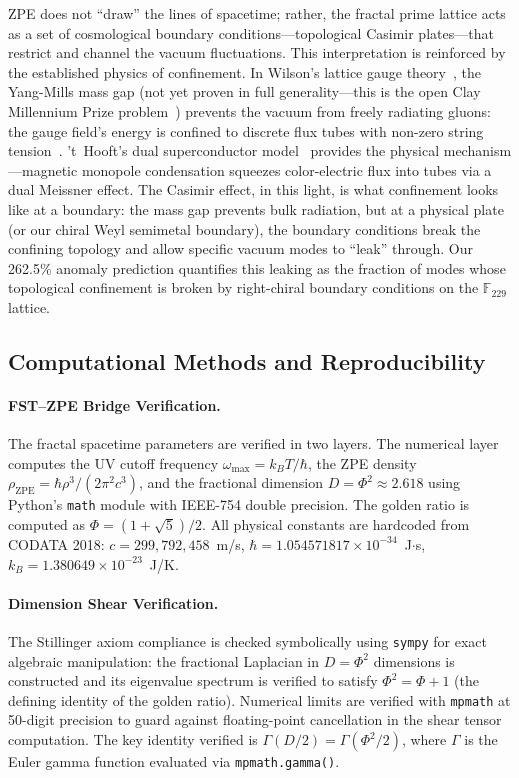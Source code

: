ZPE does not ``draw'' the lines of spacetime; rather, the fractal prime lattice acts as a set of cosmological boundary conditions---topological Casimir plates---that restrict and channel the vacuum fluctuations. This interpretation is reinforced by the established physics of confinement. In Wilson's lattice gauge theory~\cite{wilson1974}, the Yang-Mills mass gap (not yet proven in full generality---this is the open Clay Millennium Prize problem~\cite{jaffe2000}) prevents the vacuum from freely radiating gluons: the gauge field's energy is confined to discrete flux tubes with non-zero string tension~\cite{creutz1980}. 't~Hooft's dual superconductor model~\cite{thooft1981} provides the physical mechanism---magnetic monopole condensation squeezes color-electric flux into tubes via a dual Meissner effect. The Casimir effect, in this light, is what confinement looks like at a boundary: the mass gap prevents bulk radiation, but at a physical plate (or our chiral Weyl semimetal boundary), the boundary conditions break the confining topology and allow specific vacuum modes to ``leak'' through. Our 262.5\% anomaly prediction quantifies this leaking as the fraction of modes whose topological confinement is broken by right-chiral boundary conditions on the $\mathbb{F}_{229}$ lattice.


\subsection{Computational Methods and Reproducibility}

\paragraph{FST--ZPE Bridge Verification.}
The fractal spacetime parameters are verified in two layers. The numerical layer computes the UV cutoff frequency $\omega_{\max} = k_B T / \hbar$, the ZPE density $\rho_{\mathrm{ZPE}} = \hbar \rho^3 / (2\pi^2 c^3)$, and the fractional dimension $D = \Phi^2 \approx 2.618$ using Python's \texttt{math} module with IEEE-754 double precision. The golden ratio is computed as $\Phi = (1 + \sqrt{5})/2$. All physical constants are hardcoded from CODATA 2018: $c = 299{,}792{,}458$~m/s, $\hbar = 1.054571817 \times 10^{-34}$~J$\cdot$s, $k_B = 1.380649 \times 10^{-23}$~J/K.

\paragraph{Dimension Shear Verification.}
The Stillinger axiom compliance is checked symbolically using \texttt{sympy} for exact algebraic manipulation: the fractional Laplacian in $D = \Phi^2$ dimensions is constructed and its eigenvalue spectrum is verified to satisfy $\Phi^2 = \Phi + 1$ (the defining identity of the golden ratio). Numerical limits are verified with \texttt{mpmath} at 50-digit precision to guard against floating-point cancellation in the shear tensor computation. The key identity verified is $\Gamma(D/2) = \Gamma(\Phi^2/2)$, where $\Gamma$ is the Euler gamma function evaluated via \texttt{mpmath.gamma()}.

